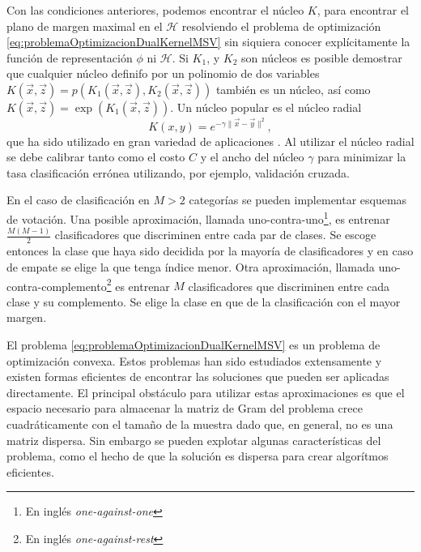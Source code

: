 \documentclass[letterpaper,12pt]{book}
\begin{document}
Con las condiciones anteriores, podemos encontrar el núcleo $K$, para encontrar el plano de margen maximal en el $\mathcal{H}$ resolviendo el problema de optimización \ref{eq:problemaOptimizacionDualKernelMSV} sin siquiera conocer explícitamente la función de representación $\phi$ ni $\mathcal{H}$. Si $K_1$, y $K_2$ son núcleos es posible demostrar que cualquier núcleo definifo por un polinomio de dos variables $K(\vec{x},\vec{z}) = p(K_1(\vec{x},\vec{z}),K_2(\vec{x},\vec{z}))$ también es un núcleo, así como $K(\vec{x},\vec{z})=\exp{(K_1(\vec{x},\vec{z}))}$. Un núcleo popular es el núcleo radial
\begin{equation}
K(x,y) = e^{-\gamma\|\vec{x}-\vec{y}\|^2},
\end{equation}
 que ha sido utilizado en gran variedad de aplicaciones \cite{cristianini_introduction_2000}. Al utilizar el núcleo radial se debe calibrar tanto como el costo $C$ y el ancho del núcleo $\gamma$ para minimizar la tasa clasificación errónea utilizando, por ejemplo, validación cruzada.

En el caso de clasificación en $M>2$ categorías se pueden implementar esquemas de votación. Una posible aproximación, llamada uno-contra-uno\footnote{En inglés \textit{one-against-one}}, es entrenar  $\frac{M(M-1)}{2}$ clasificadores que discriminen entre cada par de clases. Se escoge entonces la clase que haya sido decidida por la mayoría de clasificadores y en caso de empate se elige la que tenga índice menor. Otra aproximación, llamada uno-contra-complemento\footnote{En inglés \textit{one-against-rest}} es entrenar $M$ clasificadores que discriminen entre cada clase y su complemento. Se elige la clase en que de la clasificación con el mayor margen.

El problema \ref{eq:problemaOptimizacionDualKernelMSV} es un problema de optimización convexa. Estos problemas han sido estudiados extensamente y existen formas eficientes de encontrar las soluciones que pueden ser aplicadas directamente. El principal obstáculo para utilizar estas aproximaciones es que el espacio necesario para almacenar la  matriz de Gram del problema crece cuadráticamente con el tamaño de la muestra dado que, en general, no es una matriz dispersa. Sin embargo se pueden explotar algunas características del problema, como el hecho de que la solución es dispersa para crear algorítmos eficientes. 
\end{document}
